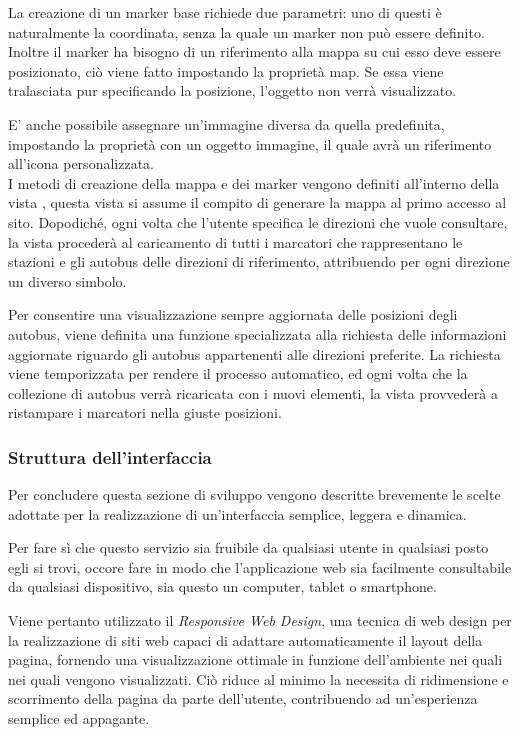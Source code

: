 La creazione di un marker base richiede due parametri: uno di questi è naturalmente la coordinata, senza la quale un marker non può essere definito. Inoltre il marker ha bisogno di un riferimento alla mappa su cui esso deve essere posizionato, ciò viene fatto impostando la proprietà map. Se essa viene tralasciata pur specificando la posizione, l'oggetto non verrà visualizzato.

E' anche possibile assegnare un'immagine diversa da quella predefinita, impostando la proprietà  con un oggetto immagine, il quale avrà un riferimento all'icona personalizzata.\\

I metodi di creazione della mappa e dei marker vengono definiti all'interno della vista , questa vista si assume il compito di generare la mappa al primo accesso al sito. Dopodiché, ogni volta che l'utente specifica le direzioni che vuole consultare, la vista procederà al caricamento di tutti i marcatori che rappresentano le stazioni e gli autobus delle direzioni di riferimento, attribuendo per ogni direzione un diverso simbolo.

Per consentire una visualizzazione sempre aggiornata delle posizioni degli autobus, viene definita una funzione specializzata alla richiesta delle informazioni aggiornate riguardo gli autobus appartenenti alle direzioni preferite. La richiesta viene temporizzata per rendere il processo automatico, ed ogni volta che la collezione di autobus verrà ricaricata con i nuovi elementi, la vista provvederà a ristampare i marcatori nella giuste posizioni.
\newpage

\subsubsection{Struttura dell'interfaccia} %
\label{ssub:struttura_dell_interfaccia}

Per concludere questa sezione di sviluppo vengono descritte brevemente le scelte adottate per la realizzazione di un'interfaccia semplice, leggera e dinamica.

Per fare sì che questo servizio sia fruibile da qualsiasi utente in qualsiasi posto egli si trovi, occore fare in modo che l'applicazione web sia facilmente consultabile da qualsiasi dispositivo, sia questo un computer, tablet o smartphone.

Viene pertanto utilizzato il {\itshape Responsive Web Design}, una tecnica di web design per la realizzazione di siti web capaci di adattare automaticamente il layout della pagina, fornendo una visualizzazione ottimale in funzione dell'ambiente nei quali nei quali vengono visualizzati. Ciò riduce al minimo la necessita di ridimensione e scorrimento della pagina da parte dell'utente, contribuendo ad un'esperienza semplice ed appagante.\\

